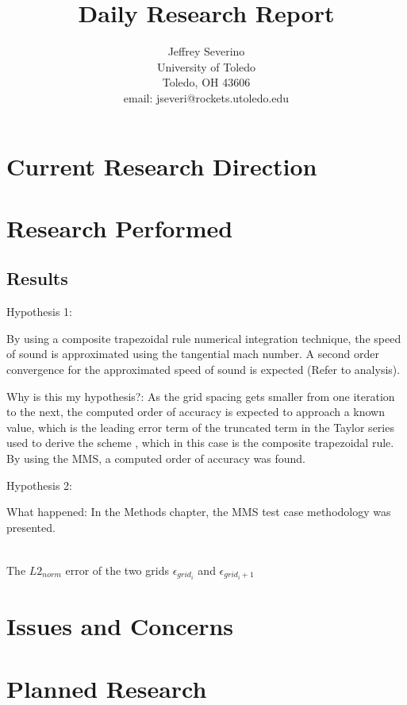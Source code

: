 \documentclass[a4paper]{article}
\begin{document}
\begin{titlepage}

    \title{
    Daily Research Report}

    \author{ Jeffrey Severino \\
        University of Toledo \\
        Toledo, OH  43606 \\
    email: jseveri@rockets.utoledo.edu}


    \maketitle

\end{titlepage}
\section{Current Research Direction}
\section{Research Performed}

\subsection{Results}

Hypothesis 1: 

By using a composite trapezoidal rule numerical integration technique, the speed
of sound is approximated using the tangential mach number. A second order 
convergence for the approximated speed of sound is expected (Refer to analysis). 

Why is this my hypothesis?:
As the grid spacing gets smaller from one iteration to the next, the computed order of accuracy is
expected to approach a known value, which is the leading error term of the 
truncated term in the Taylor series used to derive the scheme , which in this
case is the composite trapezoidal rule. By using the MMS, a computed order
of accuracy was found. 

Hypothesis 2:


What happened:
In the Methods chapter, the MMS test case methodology was presented.



\begin{align}
     
\end{align}




The $L2_{norm}$ error of the two grids 
$\epsilon_{grid_i}$ and $\epsilon_{grid_i+1}$






\section{Issues and Concerns}

\section{Planned Research}
\end{document}
